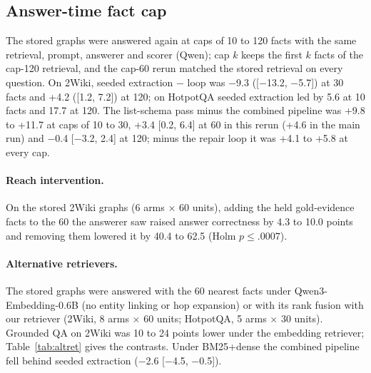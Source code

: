 \subsection{Answer-time fact cap}
\label{app:factcap}
The stored graphs were answered again at caps of 10 to 120 facts with the same retrieval, prompt, answerer and scorer (Qwen); cap $k$ keeps the first $k$ facts of the cap-120 retrieval, and the cap-60 rerun matched the stored retrieval on every question. On 2Wiki, seeded extraction $-$ loop was $-$9.3 ([$-$13.2, $-$5.7]) at 30 facts and +4.2 ([1.2, 7.2]) at 120; on HotpotQA seeded extraction led by 5.6 at 10 facts and 17.7 at 120. The list-schema pass minus the combined pipeline was +9.8 to +11.7 at caps of 10 to 30, +3.4 [0.2, 6.4] at 60 in this rerun (+4.6 in the main run) and $-$0.4 [$-$3.2, 2.4] at 120; minus the repair loop it was +4.1 to +5.8 at every cap.


\paragraph{Reach intervention.}\label{app:reach}
On the stored 2Wiki graphs (6 arms $\times$ 60 units), adding the held gold-evidence facts to the 60 the answerer saw raised answer correctness by 4.3 to 10.0 points and removing them lowered it by 40.4 to 62.5 (Holm $p \le .0007$).


\paragraph{Alternative retrievers.}\label{app:altret}
The stored graphs were answered with the 60 nearest facts under Qwen3-Embedding-0.6B (no entity linking or hop expansion) or with its rank fusion with our retriever (2Wiki, 8 arms $\times$ 60 units; HotpotQA, 5 arms $\times$ 30 units). Grounded QA on 2Wiki was 10 to 24 points lower under the embedding retriever; Table~\ref{tab:altret} gives the contrasts. Under BM25+dense the combined pipeline fell behind seeded extraction ($-$2.6 [$-$4.5, $-$0.5]).

